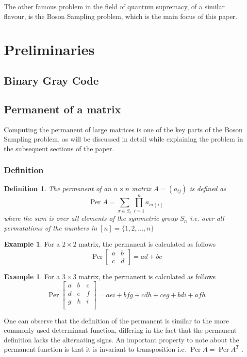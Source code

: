 \documentclass[11pt]{article}
\theoremstyle{theorem}
\theoremstyle{remark}
\theoremstyle{plain}
\newtheorem{definition}[theorem]{Definition}%
\theoremstyle{definition}
\newtheorem{example}[theorem]{Example}
\DeclareMathOperator*{\Per}{\mathrm{Per}}
\begin{document}
The other famous problem in the field of quantum supremacy, of a similar flavour, is the Boson Sampling problem, which is the main focus of this paper.

\section{Preliminaries}
\subsection{Binary Gray Code} \label{sec:gray_code}

\subsection{Permanent of a matrix} \label{sec:permanent}
Computing the permanent of large matrices is one of the key parts of the Boson Sampling problem, as will be discussed in detail while explaining the problem in the subsequent sections of the paper.
\subsubsection{Definition}
\begin{definition}{\cite{marcus_minc66}}
The permanent of an $n \times n$ matrix $A = (a_{ij})$ is defined as
\begin{equation}
\Per A = \sum_{\sigma \in S_n} \prod_{i=1}^n a_{i\sigma(i)}
\end{equation}
where the sum is over all elements of the symmetric group $S_n$ i.e. over all permutations of the numbers in $[n] = \{1, 2, ... , n\}$
\end{definition}

\begin{example}
For a $2 \times 2$ matrix, the permanent is calculated as follows
\begin{equation}
\Per 
\begin{bmatrix}
a & b \\
c & d
\end{bmatrix}
= ad + bc
\end{equation}
\end{example}
\begin{example}
For a $3 \times 3$ matrix, the permanent is calculated as follows
\begin{equation}
\Per 
\begin{bmatrix}
a & b & c\\
d & e & f\\
g & h & i\\ 
\end{bmatrix}
= aei +bfg + cdh + ceg + bdi + afh
\end{equation}
\end{example}
One can observe that the definition of the permanent is similar to the more commonly used determinant function, differing in the fact that the permanent definition lacks the alternating signs. An important property to note about the permanent function is that it is invariant to transposition i.e. $\Per A = \Per A^T$ \cite{ryser_1963}.
\end{document}
